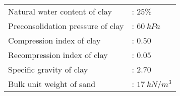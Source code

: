 \begin{tabular}{ll}
Natural water content of clay & : $25\%$ \\
Preconsolidation pressure of clay & : $60 \ kPa$ \\
Compression index of clay & : $0.50$ \\
Recompression index of clay & : $0.05$ \\
Specific gravity of clay & : $2.70$ \\
Bulk unit weight of sand & : $17 \ kN/m^3$ \\
\end{tabular}